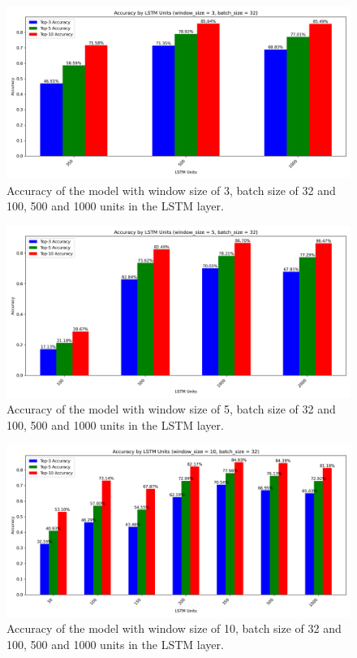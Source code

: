 \begin{figure}[h!]
    \centering
    \includegraphics[scale=0.4]{images/accuracy_by_lstm_units_window_3_batch_32.png}
    \caption{Accuracy of the model with window size of 3, batch size of 32 and 100, 500 and 1000 units in the LSTM layer.}
    \label{fig:window_size3}
\end{figure}

\begin{figure}[h!]
    \centering
    \includegraphics[scale=0.4]{images/accuracy_by_lstm_units_window_5_batch_32.png}
    \caption{Accuracy of the model with window size of 5, batch size of 32 and 100, 500 and 1000 units in the LSTM layer.}
    \label{fig:window_size5}
\end{figure}

\begin{figure}[h!]
    \centering
    \includegraphics[scale=0.4]{images/accuracy_by_lstm_units_window_10_batch_32.png}
    \caption{Accuracy of the model with window size of 10, batch size of 32 and 100, 500 and 1000 units in the LSTM layer.}
    \label{fig:window_size10}
\end{figure}



